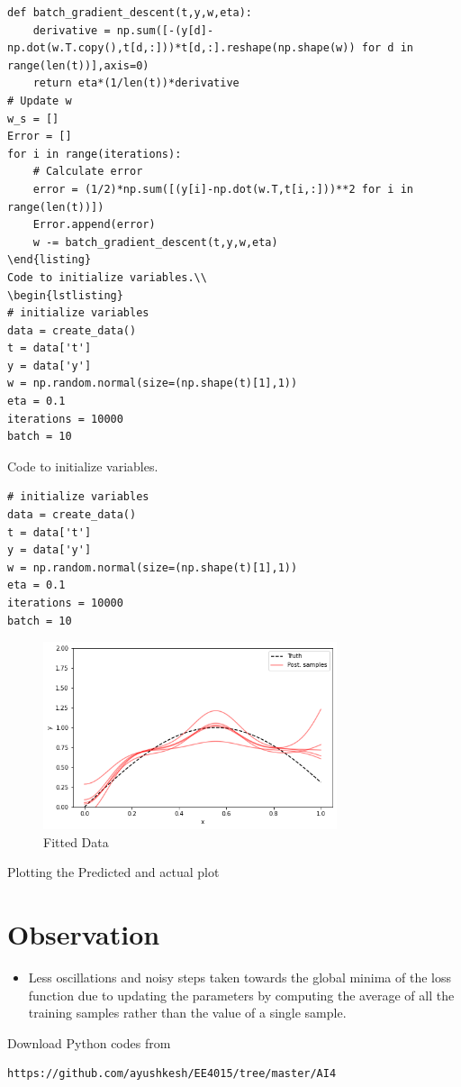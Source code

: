 \documentclass[journal,12pt,twocolumn]{IEEEtran}
\begin{document}
%
\begin{lstlisting}
def batch_gradient_descent(t,y,w,eta):
    derivative = np.sum([-(y[d]-np.dot(w.T.copy(),t[d,:]))*t[d,:].reshape(np.shape(w)) for d in range(len(t))],axis=0)
    return eta*(1/len(t))*derivative
# Update w
w_s = []
Error = []
for i in range(iterations):
    # Calculate error
    error = (1/2)*np.sum([(y[i]-np.dot(w.T,t[i,:]))**2 for i in range(len(t))])
    Error.append(error)
    w -= batch_gradient_descent(t,y,w,eta)
\end{listing}    
Code to initialize variables.\\
\begin{lstlisting}
# initialize variables
data = create_data()
t = data['t']
y = data['y']
w = np.random.normal(size=(np.shape(t)[1],1))
eta = 0.1
iterations = 10000
batch = 10
\end{lstlisting}
Code to initialize variables.\\
\begin{lstlisting}
# initialize variables
data = create_data()
t = data['t']
y = data['y']
w = np.random.normal(size=(np.shape(t)[1],1))
eta = 0.1
iterations = 10000
batch = 10
\end{lstlisting}
\begin{figure}[!h]
\begin{center}
\includegraphics[width=3.4in]{a2.png}
\end{center}
\caption{Fitted Data}
\label{fig:2}
\end{figure}
Plotting the Predicted and actual plot 
\section{Observation}
\begin{itemize}
  \item Less oscillations and noisy steps taken towards the global minima of the loss function due to updating the parameters by computing the average of all the training samples rather than the value of a single sample.
\end{itemize}
Download Python codes from 
%
\begin{lstlisting}
https://github.com/ayushkesh/EE4015/tree/master/AI4
\end{lstlisting}
\end{document}
